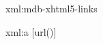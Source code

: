 
\startxmlsetups xml:mdb-xhtml5-links
\stopxmlsetups


\startxmlsetups xml:a
	[url()]
\stopxmlsetups

